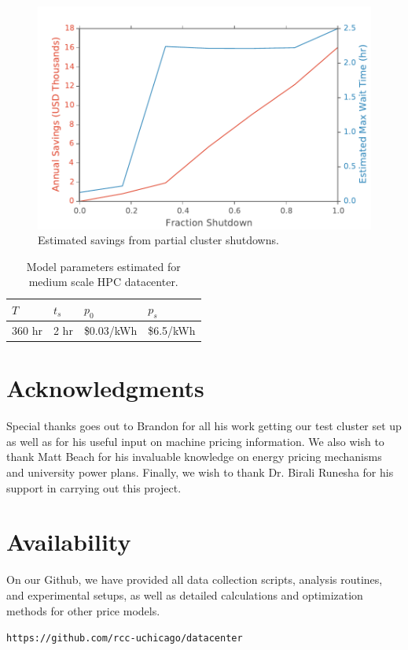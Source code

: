 \begin{figure}[t]
	\begin{center}
		\includegraphics[scale=0.5]{edeals/final}
	\end{center}
	\caption{Estimated savings from partial cluster shutdowns. }
	\label{final}
\end{figure}


\begin{table}[]
	\centering
	\label{my-label}
	\begin{tabular}{|l|l|l|l|}
		\hline
		\textbf{$T$} & \textbf{$t_s$} & \textbf{$p_0$} & \textbf{$p_s$}  \\ \hline
		360 hr & 2 hr & \$0.03/kWh  & \$6.5/kWh    \\ \hline
	\end{tabular}
	\caption{Model parameters estimated for medium scale HPC datacenter.}
	\label{params}
\end{table}

\section{Acknowledgments}

Special thanks goes out to Brandon for all his work getting our test cluster set up as well as for his useful input on machine pricing information.  We also wish to thank Matt Beach for his invaluable knowledge on energy pricing mechanisms and university power plans.  Finally, we wish to thank Dr. Birali Runesha for his support in carrying out this project.

\section{Availability}

On our Github, we have provided all data collection scripts, analysis routines, and experimental setups, as well as detailed calculations and optimization methods for other price models.  

\begin{center}
{\tt https://github.com/rcc-uchicago/datacenter}
\end{center}






